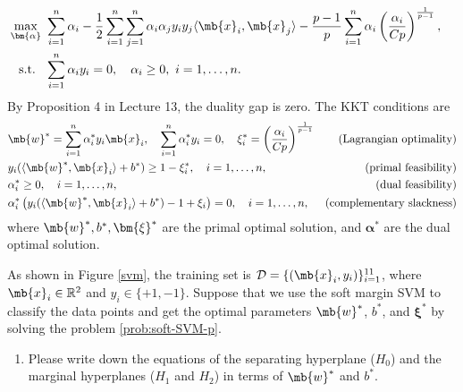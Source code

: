 \begin{exercise}
\begin{solution}
        \begin{align*}
            \max_{\bm{\alpha}} \  & \sum_{i=1}^n \alpha_i - \frac{1}{2} \sum_{i=1}^n \sum_{j=1}^n \alpha_i \alpha_j y_i y_j \langle \mb{x}_i, \mb{x}_j \rangle - \frac{p-1}{p}\sum_{i=1}^n \alpha_i \left(\frac{\alpha_i}{Cp}\right)^{\frac{1}{p-1}}, & \\
            \text{ s.t. }      \  & \sum_{i=1}^n \alpha_i y_i = 0,\quad \alpha_i \ge 0,\ i = 1, \ldots, n.                                                                                                                                            &
        \end{align*}
        By Proposition 4 in Lecture 13, the duality gap is zero. The KKT conditions are
        \begin{align*}
             & \mb{w}^* = \sum_{i=1}^n \alpha_i^* y_i \mb{x}_i,\quad \sum_{i=1}^n \alpha_i^* y_i = 0,\quad \xi_i^* = \left(\frac{\alpha_i}{Cp}\right)^{\frac{1}{p-1}} & (\text{Lagrangian optimality})   \\
             & y_i(\langle \mb{w}^*, \mb{x}_i \rangle + b^*) \ge 1 - \xi_i^*, \quad i = 1, \ldots, n,                                                                 & (\text{primal feasibility})      \\
             & \alpha_i^* \ge 0, \quad i = 1, \ldots, n,                                                                                                              & (\text{dual feasibility})        \\
             & \alpha_i^* \left(y_i(\langle \mb{w}^*, \mb{x}_i \rangle + b^*) - 1 + \xi_i\right) = 0, \quad i = 1, \ldots, n,                                         & (\text{complementary slackness})
        \end{align*}
        where $\mb{w}^*, b^*, \bm{\xi}^*$ are the primal optimal solution, and $\bm{\alpha}^*$ are the dual optimal solution.
    \end{solution}

    As shown in Figure \ref{svm}, the training set is  $\mathcal{D}=\{ (\mb{x}_i,y_i) \}_{i=1}^{11}$, where $\mb{x}_i \in \mathbb{R}^2$ and $y_i \in \{ +1,-1 \}$. Suppose that we use the soft margin SVM to classify the data points and get the optimal parameters $\mb{w}^*$, $b^*$, and $\boldsymbol{\xi}^*$  by solving the problem \eqref{prob:soft-SVM-p}.
    \begin{enumerate}[resume]
        \item Please write down the equations of the separating hyperplane ($H_0$) and the marginal hyperplanes ($H_1$ and $H_2$) in terms of $\mb{w}^*$ and $b^*$.


\end{enumerate}
\end{exercise}
